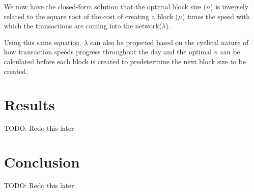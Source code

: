 \documentclass[conference]{IEEEtran}
\begin{document}
We now have the closed-form solution that the optimal block size ($n$) is inversely related to
the square root of the cost of creating a block ($\mu$) times the speed with which the transactions 
are coming into the network($\lambda$). 

Using this same equation, $\lambda$ can also be projected based on the cyclical nature of how transaction
speeds progress throughout the day and the optimal $n$ can be calculated before each block is created to 
predetermine the next block size to be created. 
\fi

\section{Results}

TODO: Redo this later

\section{Conclusion}

TODO: Redo this later



\end{document}
